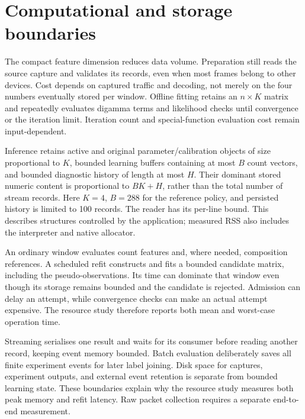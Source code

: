 \section{Computational and storage boundaries}
\label{sec:computational-boundaries}

The compact feature dimension reduces data volume. Preparation still reads the source
capture and validates its records, even when most frames belong to
other devices. Cost depends on captured traffic and decoding, not
merely on the four numbers eventually stored per window. Offline
fitting retains an $n\times K$ matrix and repeatedly evaluates
digamma terms and likelihood checks until convergence or the
iteration limit. Iteration count and special-function evaluation
cost remain input-dependent.

Inference retains active and original parameter/calibration objects
of size proportional to $K$, bounded learning buffers containing at
most $B$ count vectors, and bounded diagnostic history of length
at most $H$. Their dominant stored numeric content is proportional
to $BK+H$, rather than the total number of stream records. Here
$K=4$, $B=288$ for the reference policy, and persisted history is
limited to 100 records. The reader has its per-line bound. This
describes structures controlled by the application; measured RSS also
includes the interpreter and native allocator.

An ordinary window evaluates count features and, where needed,
composition references. A scheduled refit constructs and fits a
bounded candidate matrix, including the pseudo-observations. Its
time can dominate that window even though its storage remains
bounded and the candidate is rejected. Admission can delay an
attempt, while convergence checks can make an actual attempt
expensive. The resource study therefore reports both mean and worst-case
operation time.

Streaming serialises one result and waits for its consumer before
reading another record, keeping event memory bounded.
Batch evaluation deliberately saves all finite experiment events
for later label joining. Disk space for captures, experiment
outputs, and external event retention is separate from bounded
learning state. These boundaries explain why the resource study
measures both peak memory and refit latency. Raw packet collection requires
a separate end-to-end measurement.
